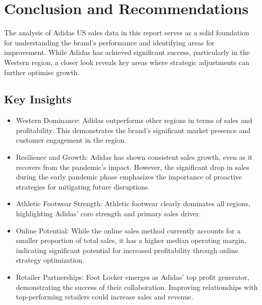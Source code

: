 \documentclass{article}\usepackage[]{graphicx}\usepackage[]{xcolor}
\begin{document}
\section{Conclusion and Recommendations}

The analysis of Adidas US sales data in this report serves as a solid foundation for understanding the brand's performance and identifying areas for improvement. While Adidas has achieved significant success, particularly in the Western region, a closer look reveals key areas where strategic adjustments can further optimise growth.

\subsection{Key Insights}
  \begin{itemize}
\item Western Dominance: Adidas outperforms other regions in terms of sales and profitability. This demonstrates the brand's significant market presence and customer engagement in the region.

\item Resilience and Growth: Adidas has shown consistent sales growth, even as it recovers from the pandemic's impact. However, the significant drop in sales during the early pandemic phase emphasizes the importance of proactive strategies for mitigating future disruptions.

\item Athletic Footwear Strength: Athletic footwear clearly dominates all regions, highlighting Adidas' core strength and primary sales driver.
\item Online Potential: While the online sales method currently accounts for a smaller proportion of total sales, it has a higher median operating margin, indicating significant potential for increased profitability through online strategy optimization.

\item Retailer Partnerships: Foot Locker emerges as Adidas' top profit generator, demonstrating the success of their collaboration. Improving relationships with top-performing retailers could increase sales and revenue.

\end{itemize}
\end{document}
